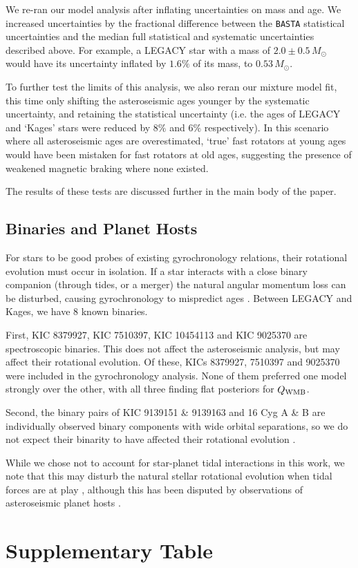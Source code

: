 We re-ran our model analysis after inflating uncertainties on mass and age. We increased uncertainties by the fractional difference between the \texttt{BASTA} statistical uncertainties and the median full statistical and systematic uncertainties described above. For example, a LEGACY star with a mass of $2.0 \pm 0.5\, M_\odot$ would have its uncertainty inflated by $1.6\%$ of its mass, to $0.53\, M_\odot$. 

To further test the limits of this analysis, we also reran our mixture model fit, this time only shifting the asteroseismic ages younger by the systematic uncertainty, and retaining the statistical uncertainty (i.e. the ages of LEGACY and `Kages' stars were reduced by $8\%$ and $6\%$ respectively). In this scenario where all asteroseismic ages are overestimated, `true' fast rotators at young ages would have been mistaken for fast rotators at old ages, suggesting the presence of weakened magnetic braking where none existed. 

The results of these tests are discussed further in the main body of the paper.

\subsection{Binaries and Planet Hosts}
For stars to be good probes of existing gyrochronology relations, their rotational evolution must occur in isolation. If a star interacts with a close binary companion (through tides, or a merger) the natural angular momentum loss can be disturbed, causing gyrochronology to mispredict ages \cite{leiner+2019, fleming+2019}. Between LEGACY and Kages, we have 8 known binaries. 

First, KIC 8379927, KIC 7510397, KIC 10454113 and KIC 9025370 are spectroscopic binaries. This does not affect the asteroseismic analysis, but may affect their rotational evolution. Of these, KICs 8379927, 7510397 and 9025370 were included in the gyrochronology analysis. None of them preferred one model strongly over the other, with all three finding flat posteriors for $Q_{\rm WMB}$.

Second, the binary pairs of KIC 9139151 \& 9139163 and 16 Cyg A \& B are individually observed binary components with wide orbital separations, so we do not expect their binarity to have affected their rotational evolution \cite{halbwachs1986, white+2013}. 

While we chose not to account for star-planet tidal interactions in this work, we note that this may disturb the natural stellar rotational evolution when tidal forces are at play \cite{maxted+2015, gallet+delorme2019, benbakoura+2019}, although this has been disputed by observations of asteroseismic planet hosts \cite{ceillier+2016}.\\



\section{Supplementary Table}





%